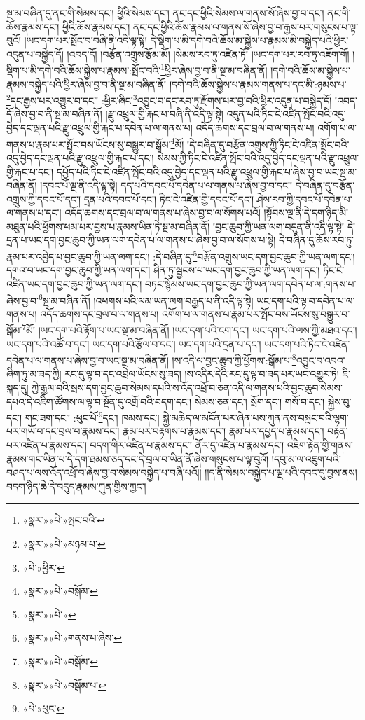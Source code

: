 སྔ་མ་བཞིན་དུ་ནང་གི་སེམས་དང་། ཕྱིའི་སེམས་དང་། ནང་དང་ཕྱིའི་སེམས་ལ་གནས་སོ་ཞེས་བྱ་བ་དང་། ནང་གི་ཆོས་རྣམས་དང་། ཕྱིའི་ཆོས་རྣམས་དང་། ནང་དང་ཕྱིའི་ཆོས་རྣམས་ལ་གནས་སོ་ཞེས་བྱ་བ་རྒྱས་པར་གསུངས་པ་ལྟ་བུའོ། །ཡང་དག་པར་སྤོང་བ་བཞི་ནི་འདི་ལྟ་སྟེ། དེ་སྡིག་པ་མི་དགེ་བའི་ཆོས་མ་སྐྱེས་པ་རྣམས་མི་བསྐྱེད་པའི་ཕྱིར་འདུན་པ་བསྐྱེད་དོ། །འབད་དོ། །བརྩོན་འགྲུས་རྩོམ་མོ། །སེམས་རབ་ཏུ་འཛིན་ཏོ། །ཡང་དག་པར་རབ་ཏུ་འཇོག་གོ། །སྡིག་པ་མི་དགེ་བའི་ཆོས་སྐྱེས་པ་རྣམས་:སྤོང་བའི་\footnote{«སྣར་»«པེ་»སྤང་བའི་}ཕྱིར་ཞེས་བྱ་བ་ནི་སྔ་མ་བཞིན་ནོ། །དགེ་བའི་ཆོས་མ་སྐྱེས་པ་རྣམས་བསྐྱེད་པའི་ཕྱིར་ཞེས་བྱ་བ་ནི་སྔ་མ་བཞིན་ནོ། །དགེ་བའི་ཆོས་སྐྱེས་པ་རྣམས་གནས་པ་དང་མི་:ཉམས་པ་\footnote{«སྣར་»«པེ་»མཉམ་པ་}དང་རྒྱས་པར་འགྱུར་བ་དང་། :ཕྱིར་ཞིང་\footnote{«པེ་»ཕྱིར་}འབྱུང་བ་དང་རབ་ཏུ་རྫོགས་པར་བྱ་བའི་ཕྱིར་འདུན་པ་བསྐྱེད་དོ། །འབད་དོ་ཞེས་བྱ་བ་ནི་སྔ་མ་བཞིན་ནོ། །རྫུ་འཕྲུལ་གྱི་རྐང་པ་བཞི་ནི་འདི་ལྟ་སྟེ། འདུན་པའི་ཏིང་ངེ་འཛིན་སྤོང་བའི་འདུ་བྱེད་དང་ལྡན་པའི་རྫུ་འཕྲུལ་གྱི་རྐང་པ་དབེན་པ་ལ་གནས་པ། འདོད་ཆགས་དང་བྲལ་བ་ལ་གནས་པ། འགོག་པ་ལ་གནས་པ་རྣམ་པར་སྤོང་བས་ཡོངས་སུ་བསྒྱུར་བ་སྒོམ་\footnote{«སྣར་»«པེ་»བསྒོམ་}མོ། །དེ་བཞིན་དུ་བརྩོན་འགྲུས་ཀྱི་ཏིང་ངེ་འཛིན་སྤོང་བའི་འདུ་བྱེད་དང་ལྡན་པའི་རྫུ་འཕྲུལ་གྱི་རྐང་པ་དང་། སེམས་ཀྱི་ཏིང་ངེ་འཛིན་སྤོང་བའི་འདུ་བྱེད་དང་ལྡན་པའི་རྫུ་འཕྲུལ་གྱི་རྐང་པ་དང་། དཔྱོད་པའི་ཏིང་ངེ་འཛིན་སྤོང་བའི་འདུ་བྱེད་དང་ལྡན་པའི་རྫུ་འཕྲུལ་གྱི་རྐང་པ་ཞེས་བྱ་བ་ཡང་སྔ་མ་བཞིན་ནོ། །དབང་པོ་ལྔ་ནི་འདི་ལྟ་སྟེ། དད་པའི་དབང་པོ་དབེན་པ་ལ་གནས་པ་ཞེས་བྱ་བ་དང་། དེ་བཞིན་དུ་བརྩོན་འགྲུས་ཀྱི་དབང་པོ་དང་། དྲན་པའི་དབང་པོ་དང་། ཏིང་ངེ་འཛིན་གྱི་དབང་པོ་དང་། ཤེས་རབ་ཀྱི་དབང་པོ་དབེན་པ་ལ་གནས་པ་དང་། འདོད་ཆགས་དང་བྲལ་བ་ལ་གནས་པ་ཞེས་བྱ་བ་ལ་སོགས་པའོ། །སྟོབས་ལྔ་ནི་དེ་དག་ཉིད་མི་མཐུན་པའི་ཕྱོགས་ཕམ་པར་བྱས་པ་རྣམས་ཡིན་ཏེ་སྔ་མ་བཞིན་ནོ། །བྱང་ཆུབ་ཀྱི་ཡན་ལག་བདུན་ནི་འདི་ལྟ་སྟེ། དེ་དྲན་པ་ཡང་དག་བྱང་ཆུབ་ཀྱི་ཡན་ལག་དབེན་པ་ལ་གནས་པ་ཞེས་བྱ་བ་ལ་སོགས་པ་སྟེ། དེ་བཞིན་དུ་ཆོས་རབ་ཏུ་རྣམ་པར་འབྱེད་པ་བྱང་ཆུབ་ཀྱི་ཡན་ལག་དང་། :དེ་བཞིན་དུ་\footnote{«སྣར་»«པེ་»}བརྩོན་འགྲུས་ཡང་དག་བྱང་ཆུབ་ཀྱི་ཡན་ལག་དང་། དགའ་བ་ཡང་དག་བྱང་ཆུབ་ཀྱི་ཡན་ལག་དང་། ཤིན་ཏུ་སྦྱངས་པ་ཡང་དག་བྱང་ཆུབ་ཀྱི་ཡན་ལག་དང་། ཏིང་ངེ་འཛིན་ཡང་དག་བྱང་ཆུབ་ཀྱི་ཡན་ལག་དང་། བཏང་སྙོམས་ཡང་དག་བྱང་ཆུབ་ཀྱི་ཡན་ལག་དབེན་པ་ལ་:གནས་པ་ཞེས་བྱ་བ་\footnote{«སྣར་»«པེ་»གནས་པ་ཞེས་}སྔ་མ་བཞིན་ནོ། །འཕགས་པའི་ལམ་ཡན་ལག་བརྒྱད་པ་ནི་འདི་ལྟ་སྟེ། ཡང་དག་པའི་ལྟ་བ་དབེན་པ་ལ་གནས་པ། འདོད་ཆགས་དང་བྲལ་བ་ལ་གནས་པ། འགོག་པ་ལ་གནས་པ་རྣམ་པར་སྤོང་བས་ཡོངས་སུ་བསྒྱུར་བ་སྒོམ་\footnote{«སྣར་»«པེ་»བསྒོམ་}མོ། །ཡང་དག་པའི་རྟོག་པ་ཡང་སྔ་མ་བཞིན་ནོ། །ཡང་དག་པའི་ངག་དང་། ཡང་དག་པའི་ལས་ཀྱི་མཐའ་དང་། ཡང་དག་པའི་འཚོ་བ་དང་། ཡང་དག་པའི་རྩོལ་བ་དང་། ཡང་དག་པའི་དྲན་པ་དང་། ཡང་དག་པའི་ཏིང་ངེ་འཛིན་དབེན་པ་ལ་གནས་པ་ཞེས་བྱ་བ་ཡང་སྔ་མ་བཞིན་ནོ། །ས་འདི་ལ་བྱང་ཆུབ་ཀྱི་ཕྱོགས་:སྒོམ་པ་\footnote{«སྣར་»«པེ་»བསྒོམ་པ་}འབྱུང་བ་འབའ་ཞིག་ཏུ་མ་ཟད་ཀྱི། རང་དུ་ལྟ་བ་དང་འབྲེལ་ཡོངས་སུ་ཟད། །ས་འདིར་དེའི་རང་དུ་ལྟ་བ་ཟད་པར་ཡང་འགྱུར་ཏེ། ཇི་སྐད་དུ། ཀྱེ་རྒྱལ་བའི་སྲས་དག་བྱང་ཆུབ་སེམས་དཔའི་ས་འོད་འཕྲོ་བ་ཅན་འདི་ལ་གནས་པའི་བྱང་ཆུབ་སེམས་དཔའ་དེ་འཇིག་ཚོགས་ལ་ལྟ་བ་སྔོན་དུ་འགྲོ་བའི་བདག་དང་། སེམས་ཅན་དང་། སྲོག་དང་། གསོ་བ་དང་། སྐྱེས་བུ་དང་། གང་ཟག་དང་། :ཕུང་པོ་\footnote{«པེ་»ཕུང་}དང་། ཁམས་དང་། སྐྱེ་མཆེད་ལ་མངོན་པར་ཞེན་པས་ཀུན་ནས་བསླང་བའི་ལྷག་པར་གཡོ་བ་དང་བྲལ་བ་རྣམས་དང་། རྣམ་པར་བརྟགས་པ་རྣམས་དང་། རྣམ་པར་དཔྱད་པ་རྣམས་དང་། བརྟན་པར་འཛིན་པ་རྣམས་དང་། བདག་གིར་འཛིན་པ་རྣམས་དང་། ནོར་དུ་འཛིན་པ་རྣམས་དང་། འཇིག་རྟེན་གྱི་གནས་རྣམས་གང་ཡིན་པ་དེ་དག་ཐམས་ཅད་དང་དེ་བྲལ་བ་ཡིན་ནོ་ཞེས་གསུངས་པ་ལྟ་བུའོ། །དབུ་མ་ལ་འཇུག་པའི་བཤད་པ་ལས་འོད་འཕྲོ་བ་ཞེས་བྱ་བ་སེམས་བསྐྱེད་པ་བཞི་པའོ།། །།ད་ནི་སེམས་བསྐྱེད་པ་ལྔ་པའི་དབང་དུ་བྱས་ནས། བདག་ཉིད་ཆེ་དེ་བདུད་རྣམས་ཀུན་གྱིས་ཀྱང་། 
